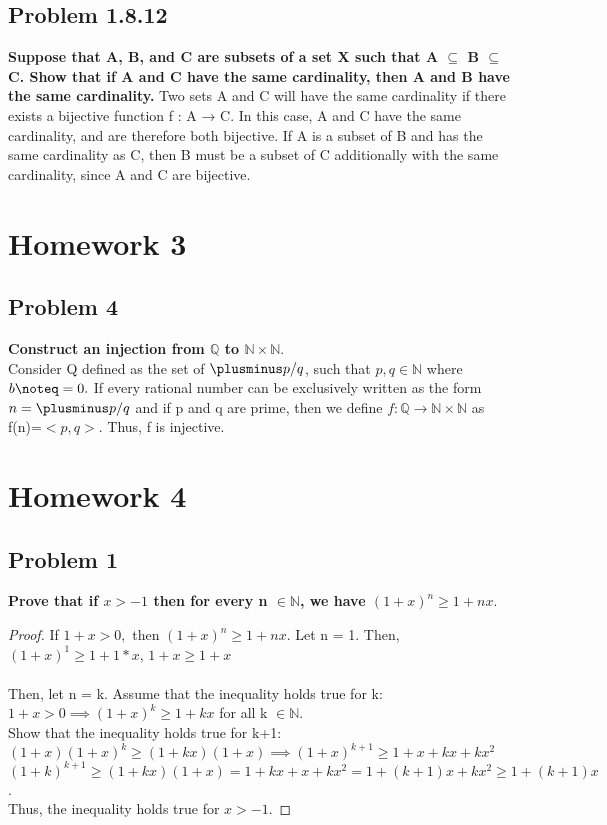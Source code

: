 \documentclass[12pt]{article}
\theoremstyle{definition}
\numberwithin{equation}{subsection}
\begin{document}
\subsection{Problem 1.8.12}
\textbf{Suppose that A, B, and C are subsets of a set X such that A $\subseteq$ B $\subseteq$ C. Show that if A and C have the same cardinality, then A and B have the same cardinality.}
Two sets A and C will have the same cardinality if there exists a bijective function f : A → C. In this case, A and C have the same cardinality, and are therefore both bijective. If A is a subset of B and has the same cardinality as C, then B must be a subset of C additionally with the same cardinality, since A and C are bijective.


\section{Homework 3}
\subsection{Problem 4}
\textbf{Construct an injection from $\mathbb{Q}$ to $\mathbb{N}\times\mathbb{N}$}.\\
Consider Q defined as the set of $\plusminus p/q$, such that $p, q \in \mathbb{N}$ where $b \noteq = 0.$
If every rational number can be exclusively written as the form $n = \plusminus p/q$ and if p and q are prime,
then we define $f: \mathbb{Q} \rightarrow \mathbb{N} \times \mathbb{N}$ as f(n)=$<p,q>.$
Thus, f is injective.

\section{Homework 4}
\subsection{Problem 1}
\textbf{Prove that if $x > −1$ then for every n $\in \mathbb{N}$, we have $(1+x)^{n}\geq1+nx.$}
\begin{proof}
If $1 + x > 0,$ then $(1+x)^n \geq 1 + nx$.
Let n = 1. Then, $(1+x)^1 \geq 1+1*x$, $1+x \geq 1+x$
\\\\
Then, let n = k. Assume that the inequality holds true for k:
\\
$ 1+x > 0 \implies (1+x)^k \geq 1+kx$ for all k $\in \mathbb{N}.$
\\
Show that the inequality holds true for k+1:\\
$(1+x)(1+x)^k \geq (1+kx)(1+x) \implies (1+x)^{k+1} \geq 1 + x + kx + kx^{2}$
\\
$(1+k)^{k+1} \geq (1+kx)(1+x) = 1+ kx + x + kx^{2} = 1 + (k+1)x + kx^{2} \geq 1 + (k+1)x$.\\
Thus, the inequality holds true for $x > -1.$

\end{proof}
\end{document}

